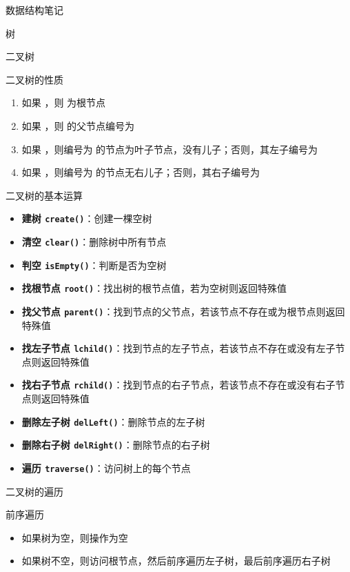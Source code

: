 \documentclass[
  ignorenonframetext,
]{beamer}
\providecommand{\tightlist}{%
  \setlength{\itemsep}{0pt}\setlength{\parskip}{0pt}}
\begin{document}
\begin{frame}[fragile]{数据结构笔记}
\begin{block}{树}
\begin{block}{二叉树}
\begin{block}{二叉树的性质}
\begin{enumerate}
  \begin{enumerate}
  \tightlist
  \item
    如果 {}，则 {} 为根节点
  \item
    如果 {}，则 {} 的父节点编号为 {}
  \item
    如果 {}，则编号为 {} 的节点为叶子节点，没有儿子；否则，其左子编号为
    {}
  \item
    如果 {}，则编号为 {} 的节点无右儿子；否则，其右子编号为 {}
  \end{enumerate}
\end{enumerate}
\end{block}

\begin{block}{二叉树的基本运算}
\protect{}\label{ux4e8cux53c9ux6811ux7684ux57faux672cux8fd0ux7b97}
\begin{itemize}
\tightlist
\item
  \textbf{建树 \texttt{create()}}：创建一棵空树
\item
  \textbf{清空 \texttt{clear()}}：删除树中所有节点
\item
  \textbf{判空 \texttt{isEmpty()}}：判断是否为空树
\item
  \textbf{找根节点
  \texttt{root()}}：找出树的根节点值，若为空树则返回特殊值
\item
  \textbf{找父节点
  \texttt{parent()}}：找到节点的父节点，若该节点不存在或为根节点则返回特殊值
\item
  \textbf{找左子节点
  \texttt{lchild()}}：找到节点的左子节点，若该节点不存在或没有左子节点则返回特殊值
\item
  \textbf{找右子节点
  \texttt{rchild()}}：找到节点的右子节点，若该节点不存在或没有右子节点则返回特殊值
\item
  \textbf{删除左子树 \texttt{delLeft()}}：删除节点的左子树
\item
  \textbf{删除右子树 \texttt{delRight()}}：删除节点的右子树
\item
  \textbf{遍历 \texttt{traverse()}}：访问树上的每个节点
\end{itemize}
\end{block}

\begin{block}{二叉树的遍历}
\protect{}\label{ux4e8cux53c9ux6811ux7684ux904dux5386}
\begin{block}{前序遍历}
\protect{}\label{ux524dux5e8fux904dux5386}
\begin{itemize}
\tightlist
\item
  如果树为空，则操作为空
\item
  如果树不空，则访问根节点，然后前序遍历左子树，最后前序遍历右子树
\end{itemize}
\end{block}


\end{block}
\end{block}
\end{block}
\end{frame}
\end{document}
